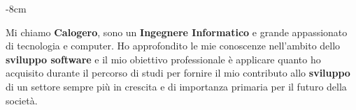 \documentclass[10pt,a4paper]{altacv}
\begin{document}







\begin{adjustwidth}{}{-8cm}
\makecvheader
\end{adjustwidth}

Mi chiamo \textbf{Calogero}, sono un \textbf{Ingegnere Informatico} e grande appassionato di tecnologia e computer. Ho approfondito le mie conoscenze nell'ambito dello \textbf{sviluppo software} e il mio obiettivo professionale è applicare quanto ho acquisito durante il
percorso di studi per fornire il mio contributo allo \textbf{sviluppo} di un settore sempre più in crescita e di
importanza primaria per il futuro della società.


\end{document}
